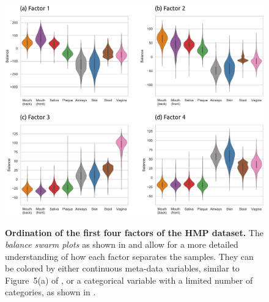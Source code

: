 \clearpage

\begin{figure}[!htb]
    \centering
     \includegraphics[width=\linewidth]{pdf/hmp_pf_all_violins.pdf}
    \begin{subfigure}{0pt}
        \label{supp:fig:hmp_pf_all_violins:sub:factor_1}
    \end{subfigure}
    \begin{subfigure}{0pt}
        \label{supp:fig:hmp_pf_all_violins:sub:factor_2}
    \end{subfigure}
    \begin{subfigure}{0pt}
        \label{supp:fig:hmp_pf_all_violins:sub:factor_3}
    \end{subfigure}
    \begin{subfigure}{0pt}
        \label{supp:fig:hmp_pf_all_violins:sub:factor_4}
    \end{subfigure}
    \caption{
        \textbf{Ordination of the first four factors of the \ac{HMP} dataset.}
        The \emph{balance swarm plots} as shown in
         and
        allow for a more detailed understanding of how each factor separates the samples.
        They can be colored by either continuous meta-data variables, similar to Figure~5(a) of \cite{Washburne2017a},
        or a categorical variable with a limited number of categories, as shown in .
}
\end{figure}
